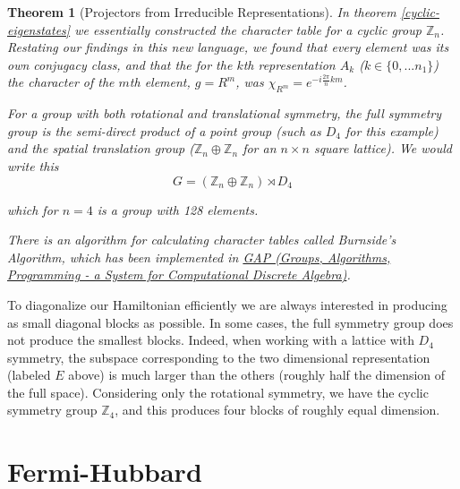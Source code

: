 \documentclass{article}
\newtheorem{theorem}{Theorem}[section]
\theoremstyle{definition}
\begin{document}
\begin{theorem}[Projectors from Irreducible Representations]
In theorem \ref{cyclic-eigenstates} we essentially constructed the character table for a cyclic group $\mathbb{Z}_n$. Restating our findings in this new language, we found that every element was its own conjugacy class, and that the for the $k$th representation $A_k$ ($k \in \{0,...n_1\}$) the character of the $m$th element, $g = R^m$, was $\chi_{R^m} = e^{-i \frac{2\pi}{n} km}$.

For a group with both rotational and translational symmetry, the full symmetry group is the semi-direct product of a point group (such as $D_4$ for this example) and the spatial translation group ($\mathbb{Z}_n \oplus \mathbb{Z}_n$ for an $n \times n$ square lattice). We would write this 
\begin{equation}
G = (\mathbb{Z}_n \oplus \mathbb{Z}_n) \rtimes D_4
\end{equation}

which for $n=4$ is a group with 128 elements.

There is an algorithm for calculating character tables called \emph{Burnside's Algorithm}, which has been implemented in \href{https://www.gap-system.org/}{GAP (Groups, Algorithms, Programming - a System for Computational Discrete Algebra)}.


\end{theorem}

To diagonalize our Hamiltonian efficiently we are always interested in producing as small diagonal blocks as possible. In some cases, the full symmetry group does not produce the smallest blocks. Indeed, when working with a lattice with $D_4$ symmetry, the subspace corresponding to the two dimensional representation (labeled $E$ above) is much larger than the others (roughly half the dimension of the full space). Considering only the rotational symmetry, we have the cyclic symmetry group $\mathbb{Z}_4$, and this produces four blocks of roughly equal dimension.

\section{Fermi-Hubbard}
\end{document}

